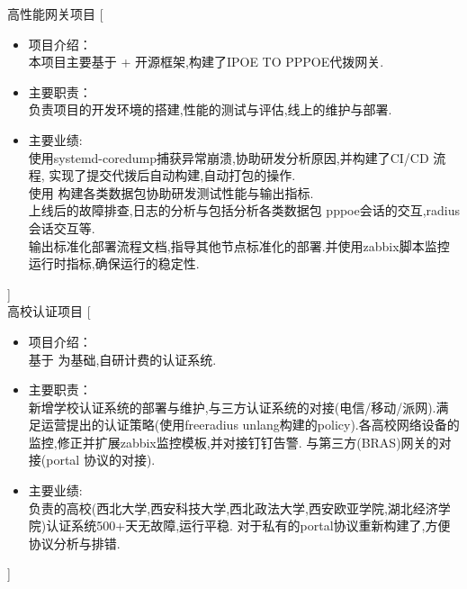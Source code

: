 \documentclass[zh]{resume}
\begin{document}
\begin{experiences}
  {高性能网关项目}%
  [\begin{itemize}
    \item 项目介绍：\\
    本项目主要基于 +  开源框架,构建了IPOE TO PPPOE代拨网关.
    \item 主要职责：\\
    负责项目的开发环境的搭建,性能的测试与评估,线上的维护与部署. 
    \item 主要业绩: \\
    使用systemd-coredump捕获异常崩溃,协助研发分析原因,并构建了CI/CD 流程, 实现了提交代拨后自动构建,自动打包的操作. \\
    使用  构建各类数据包协助研发测试性能与输出指标. \\
    上线后的故障排查,日志的分析与包括分析各类数据包 pppoe会话的交互,radius 会话交互等.\\
    输出标准化部署流程文档,指导其他节点标准化的部署.并使用zabbix脚本监控运行时指标,确保运行的稳定性. 
  \end{itemize}]
  \\
  {高校认证项目}%
  [\begin{itemize}
    \item 项目介绍：\\
    基于 为基础,自研计费的认证系统.
    \item 主要职责：\\
    新增学校认证系统的部署与维护,与三方认证系统的对接(电信/移动/派网).满足运营提出的认证策略(使用freeradius unlang构建的policy).各高校网络设备的监控,修正并扩展zabbix监控模板,并对接钉钉告警.
    与第三方(BRAS)网关的对接(portal 协议的对接).
    \item 主要业绩: \\
    负责的高校(西北大学,西安科技大学,西北政法大学,西安欧亚学院,湖北经济学院)认证系统500+天无故障,运行平稳.
    对于私有的portal协议重新构建了,方便协议分析与排错.
  \end{itemize}]
  \\

\end{experiences}
\end{document}
